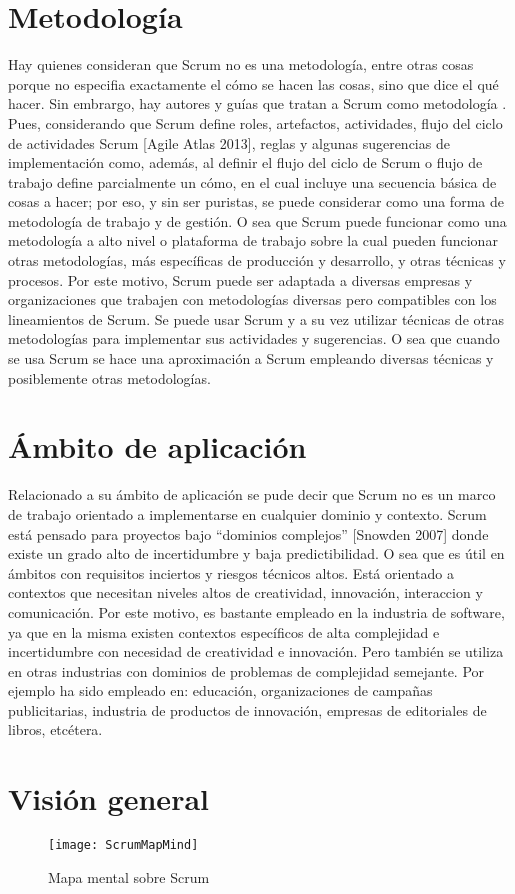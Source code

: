\section{Metodología}

Hay quienes consideran que Scrum no es una metodología, entre otras cosas porque no especifia exactamente el cómo se hacen las cosas, 
sino que dice el qué hacer. Sin embrargo, hay autores y guías que tratan a Scrum como metodología \cite{SBOK-2013} \cite{Ken-Schwaber-1995}. 
Pues, considerando que Scrum define roles, artefactos, actividades, flujo del ciclo de actividades Scrum [Agile Atlas 2013], reglas y algunas 
sugerencias de implementación como, además, al definir el flujo del ciclo de Scrum o flujo de trabajo define parcialmente un cómo, en el 
cual incluye una secuencia básica de cosas a hacer; por eso, y sin ser puristas, se puede considerar como una forma de metodología de 
trabajo y de gestión. O sea que Scrum puede funcionar como una metodología a alto nivel o plataforma de trabajo sobre la cual pueden 
funcionar otras metodologías, más específicas de producción y desarrollo, y otras técnicas y procesos. Por este motivo, 
Scrum puede ser adaptada a diversas empresas y organizaciones que trabajen con metodologías diversas pero compatibles con los 
lineamientos de Scrum. Se puede usar Scrum y a su vez utilizar técnicas de otras metodologías para implementar sus actividades y sugerencias. 
O sea que cuando se usa Scrum se hace una aproximación a Scrum empleando diversas técnicas y posiblemente otras metodologías.

\section{Ámbito de aplicación}

Relacionado a su ámbito de aplicación se pude decir que Scrum no es un marco de trabajo orientado a implementarse en cualquier dominio y contexto. 
Scrum está pensado para proyectos bajo “dominios complejos” [Snowden 2007] donde existe un grado alto de incertidumbre y baja predictibilidad. 
O sea que es útil en ámbitos con requisitos inciertos y riesgos técnicos altos. Está orientado a contextos que necesitan niveles altos de creatividad, 
innovación, interaccion y comunicación. Por este motivo, es bastante empleado en la industria de software, ya que en la misma existen contextos 
específicos de alta complejidad e incertidumbre con necesidad de creatividad e innovación. Pero también se utiliza en otras industrias con dominios 
de problemas de complejidad semejante. Por ejemplo ha sido empleado en: educación, organizaciones de campañas publicitarias, industria de productos 
de innovación, empresas de editoriales de libros, etcétera.

\section{Visión general}


\begin{figure}[h]
  \centering
  \texttt{[image: ScrumMapMind]}
  \caption{Mapa mental sobre Scrum}
  \centering
  \label{fig:ScrumMapMind} %
\end{figure}
